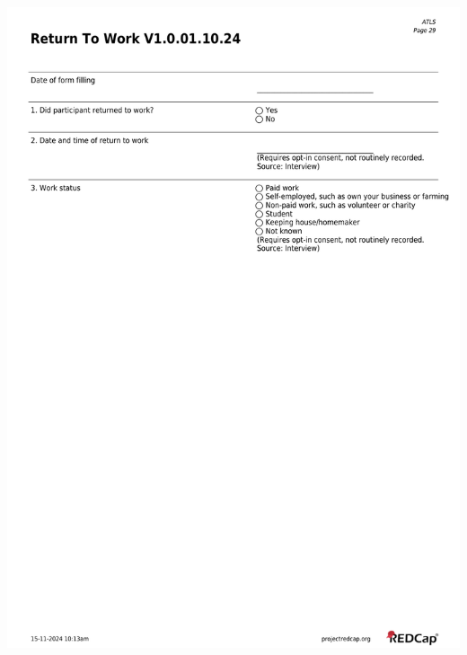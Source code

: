 \documentclass[
]{scrartcl}
\begin{document}
\includegraphics{../case-record-form/instrument-pdfs/pages/all-instruments-29.pdf}
\end{document}
